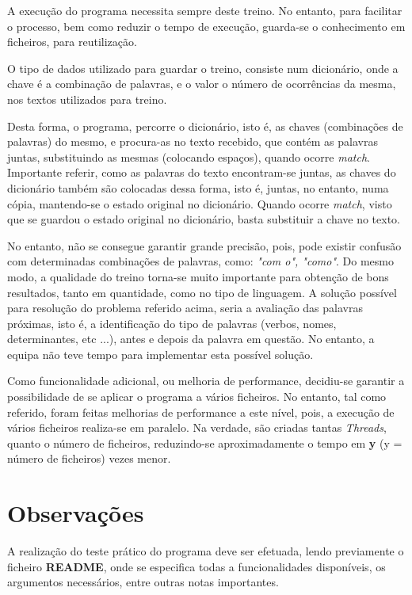 \documentclass[11pt,a4paper]{report}%
\begin{document}
\hspace{5mm} A execução do programa necessita sempre deste treino. No entanto, para facilitar o processo, bem como reduzir o tempo de execução, guarda-se o conhecimento em ficheiros, para reutilização.

\hspace{5mm} O tipo de dados utilizado para guardar o treino, consiste num dicionário, onde a chave é a combinação de palavras, e o valor o número de ocorrências da mesma, nos textos utilizados para treino. 

\hspace{5mm} Desta forma, o programa, percorre o dicionário, isto é, as chaves (combinações de palavras) do mesmo, e procura-as no texto recebido, que contém as palavras juntas, substituindo as mesmas (colocando espaços), quando ocorre \textit{match}. Importante referir, como as palavras do texto encontram-se juntas, as chaves do dicionário também são colocadas dessa forma, isto é, juntas, no entanto, numa cópia, mantendo-se o estado original no dicionário. Quando ocorre \textit{match}, visto que se guardou o estado original no dicionário, basta substituir a chave no texto.

\hspace{5mm} No entanto, não se consegue garantir grande precisão, pois, pode existir confusão com determinadas combinações de palavras, como: \textit{"com o", "como"}. Do mesmo modo, a qualidade do treino torna-se muito importante para obtenção de bons resultados, tanto em quantidade, como no tipo de linguagem. A solução possível para resolução do problema referido acima, seria a avaliação das palavras próximas, isto é, a identificação do tipo de palavras (verbos, nomes, determinantes, etc ...), antes e depois da palavra em questão. No entanto, a equipa não teve tempo para implementar esta possível solução. 

\hspace{5mm} Como funcionalidade adicional, ou melhoria de performance, decidiu-se garantir a possibilidade de se aplicar o programa a vários ficheiros. No entanto, tal como referido, foram feitas melhorias de performance a este nível, pois, a execução de vários ficheiros realiza-se em paralelo. Na verdade, são criadas tantas \textit{Threads}, quanto o número de ficheiros, reduzindo-se aproximadamente o tempo em \textbf{y} (y = número de ficheiros) vezes menor.

\section{Observações}
\hspace{5mm} A realização do teste prático do programa deve ser efetuada, lendo previamente o ficheiro \textbf{README}, onde se especifica todas a funcionalidades disponíveis, os argumentos necessários, entre outras notas importantes.
\end{document}
